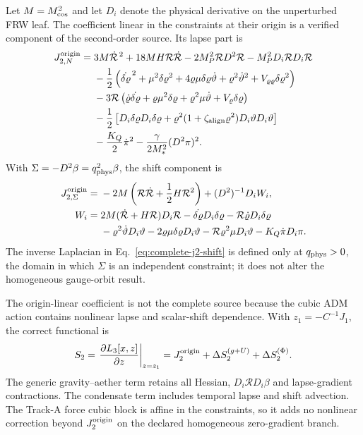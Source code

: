 Let $M=M_{\rm cos}^2$ and let $D_i$ denote the physical derivative on the
unperturbed FRW leaf.  The coefficient linear in the constraints at their
origin is a verified component of the second-order source.  Its lapse part is
\begin{align}
 J_{2,N}^{\rm origin}={}&3M\dot{\mathcal R}^{\,2}
 +18MH\mathcal R\dot{\mathcal R}
 -2M_P^2\mathcal R D^2\mathcal R
 -M_P^2D_i\mathcal R D_i\mathcal R \nonumber\\
 &-\frac12\left(\dot{\delta\varrho}^{\,2}
 +\mu^2\delta\varrho^2+4\varrho\mu\delta\varrho\dot\vartheta
 +\varrho^2\dot\vartheta^2+V_{\varrho\varrho}\delta\varrho^2\right)
 \nonumber\\
 &-3\mathcal R\left(\dot\varrho\dot{\delta\varrho}
 +\varrho\mu^2\delta\varrho+\varrho^2\mu\dot\vartheta
 +V_\varrho\delta\varrho\right)\nonumber\\
 &-\frac12\left[D_i\delta\varrho D_i\delta\varrho
 +\varrho^2(1+\zeta_{\rm align}\varrho^2)
 D_i\vartheta D_i\vartheta\right]\nonumber\\
 &-\frac{K_Q}{2}\dot\pi^2
 -\frac{\gamma}{2M_*^2}(D^2\pi)^2 .
 \label{eq:complete-j2-lapse}
\end{align}
With $\Sigma=-D^2\beta=q_{\rm phys}^2\beta$, the shift component is
\begin{align}
 J_{2,\Sigma}^{\rm origin}={}&-2M\left(\mathcal R\dot{\mathcal R}
 +\frac12H\mathcal R^2\right)+(D^2)^{-1}D_iW_i,
 \label{eq:complete-j2-shift}\\
 W_i={}&2M(\dot{\mathcal R}+H\mathcal R)D_i\mathcal R
 -\dot{\delta\varrho}D_i\delta\varrho
 -\mathcal R\dot\varrho D_i\delta\varrho\nonumber\\
 &-\varrho^2\dot\vartheta D_i\vartheta
 -2\varrho\mu\delta\varrho D_i\vartheta
 -\mathcal R\varrho^2\mu D_i\vartheta
 -K_Q\dot\pi D_i\pi .
\end{align}
The inverse Laplacian in
Eq.~\eqref{eq:complete-j2-shift} is defined only at
$q_{\rm phys}>0$, the domain in which $\Sigma$ is an independent constraint;
it does not alter the homogeneous gauge-orbit result.

The origin-linear coefficient is not the complete source because the cubic
ADM action contains nonlinear lapse and scalar-shift dependence.  With
$z_1=-C^{-1}J_1$, the correct functional is
\begin{equation}
 S_2=\left.\frac{\partial L_3[x,z]}{\partial z}\right|_{z=z_1}
 =J_2^{\rm origin}+\Delta S_2^{(g+U)}+\Delta S_2^{(\Phi)} .
 \label{eq:complete-dressed-s2}
\end{equation}
The generic gravity--aether term retains all Hessian,
$D_i\mathcal R D_i\beta$ and lapse-gradient contractions.  The condensate
term includes temporal lapse and shift advection.  The Track-A force cubic
block is affine in the constraints, so it adds no nonlinear correction beyond
$J_2^{\rm origin}$ on the declared homogeneous zero-gradient branch.

